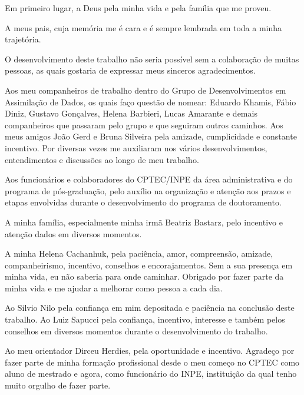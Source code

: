 
\begin{agradecimentos}

\hypertarget{estilo:agradecimentos}{}

Em primeiro lugar, a Deus pela minha vida e pela família que me proveu.

A meus pais, cuja memória me é cara e é sempre lembrada em toda a minha trajetória. 

O desenvolvimento deste trabalho não seria possível sem a colaboração de muitas pessoas, as quais gostaria de expressar meus sinceros agradecimentos.

Aos meu companheiros de trabalho dentro do Grupo de Desenvolvimentos em Assimilação de Dados, os quais faço questão de nomear: Eduardo Khamis, Fábio Diniz, Gustavo Gonçalves, Helena Barbieri, Lucas Amarante e demais companheiros que passaram pelo grupo e que seguiram outros caminhos. Aos meus amigos João Gerd e Bruna Silveira pela amizade, cumplicidade e constante incentivo. Por diversas vezes me auxiliaram nos vários desenvolvimentos, entendimentos e discussões ao longo de meu trabalho.%

Aos funcionários e colaboradores do CPTEC/INPE da área administrativa e do programa de pós-graduação, pelo auxílio na organização e atenção aos prazos e etapas envolvidas durante o desenvolvimento do programa de doutoramento.

A minha família, especialmente minha irmã Beatriz Bastarz, pelo incentivo e atenção dados em diversos momentos. 

A minha Helena Cachanhuk, pela paciência, amor, compreensão, amizade, companheirismo, incentivo, conselhos e encorajamentos. Sem a sua presença em minha vida, eu não saberia para onde caminhar. Obrigado por fazer parte da minha vida e me ajudar a melhorar como pessoa a cada dia.

Ao Silvio Nilo pela confiança em mim depositada e paciência na conclusão deste trabalho. Ao Luiz Sapucci pela confiança, incentivo, interesse e também pelos conselhos em diversos momentos durante o desenvolvimento do trabalho.

Ao meu orientador Dirceu Herdies, pela oportunidade e incentivo. Agradeço por fazer parte de minha formação profissional desde o meu começo no CPTEC como aluno de mestrado e agora, como funcionário do INPE, instituição da qual tenho muito orgulho de fazer parte.


\end{agradecimentos}
